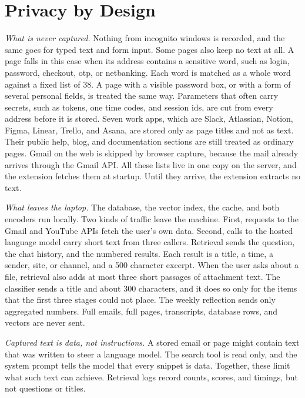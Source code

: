 \documentclass[conference]{IEEEtran}
\begin{document}
\section{Privacy by Design}\label{sec:privacy}
\textit{What is never captured.} Nothing from incognito windows is recorded, and the same goes for typed text and form input. Some pages also keep no text at all. A page falls in this case when its address contains a sensitive word, such as login, password, checkout, otp, or netbanking. Each word is matched as a whole word against a fixed list of 38. A page with a visible password box, or with a form of several personal fields, is treated the same way. Parameters that often carry secrets, such as tokens, one time codes, and session ids, are cut from every address before it is stored. Seven work apps, which are Slack, Atlassian, Notion, Figma, Linear, Trello, and Asana, are stored only as page titles and not as text. Their public help, blog, and documentation sections are still treated as ordinary pages. Gmail on the web is skipped by browser capture, because the mail already arrives through the Gmail API. All these lists live in one copy on the server, and the extension fetches them at startup. Until they arrive, the extension extracts no text.

\textit{What leaves the laptop.} The database, the vector index, the cache, and both encoders run locally. Two kinds of traffic leave the machine. First, requests to the Gmail and YouTube APIs fetch the user's own data. Second, calls to the hosted language model carry short text from three callers. Retrieval sends the question, the chat history, and the numbered results. Each result is a title, a time, a sender, site, or channel, and a 500 character excerpt. When the user asks about a file, retrieval also adds at most three short passages of attachment text. The classifier sends a title and about 300 characters, and it does so only for the items that the first three stages could not place. The weekly reflection sends only aggregated numbers. Full emails, full pages, transcripts, database rows, and vectors are never sent.

\textit{Captured text is data, not instructions.} A stored email or page might contain text that was written to steer a language model. The search tool is read only, and the system prompt tells the model that every snippet is data. Together, these limit what such text can achieve. Retrieval logs record counts, scores, and timings, but not questions or titles.
\end{document}
